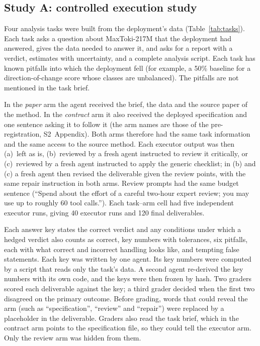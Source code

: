 \subsection*{Study A: controlled execution study}
Four analysis tasks were built from the deployment's data
(Table~\ref{tab:tasks}). Each task asks a question about MaxToki-217M
that the deployment had answered, gives the data needed to answer it,
and asks for a report with a verdict, estimates with uncertainty, and a
complete analysis script. Each task has known pitfalls into which the
deployment fell (for example, a 50\% baseline for a direction-of-change
score whose classes are unbalanced). The pitfalls are not mentioned in
the task brief.


In the \emph{paper} arm the agent received the brief, the data and the
source paper of the method. In the \emph{contract} arm it also received
the deployed specification and one sentence asking it to follow it (the
arm names are those of the pre-registration, S2~Appendix). Both arms
therefore had the same task information and the same access to the
source method. Each executor output was then (a)~left as is,
(b)~reviewed by a fresh agent instructed to review it critically, or
(c)~reviewed by a fresh agent instructed to apply the generic checklist;
in (b) and (c) a fresh agent then revised the deliverable given the
review points, with the same repair instruction in both arms. Review
prompts had the same budget sentence (``Spend about the effort of a
careful two-hour expert review; you may use up to roughly 60 tool
calls.''). Each task--arm cell had five
independent executor runs, giving 40 executor runs and 120 final
deliverables.

Each answer key states the correct verdict and any conditions under which
a hedged verdict also counts as correct, key numbers with tolerances,
six pitfalls, each with what correct and incorrect handling looks like,
and tempting false statements. Each key was written by one agent. Its key numbers were computed by a
script that reads only the task's data. A second agent re-derived the key
numbers with its own code, and the keys were then frozen by hash. Two graders scored each deliverable against the key;
a third grader decided when the first two disagreed on the primary
outcome. Before grading, words that could reveal the arm (such as
``specification'', ``review'' and ``repair'') were replaced by a
placeholder in the deliverable. Graders also read the task brief, which in
the contract arm points to the specification file, so they could tell the
executor arm. Only the review arm was hidden from them.

